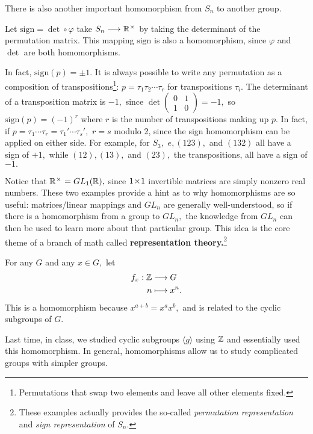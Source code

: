 There is also another important homomorphism from $S_n$ to another group.

\begin{example}
Let $\text{sign} = \det \circ \varphi$ take $S_n \longrightarrow \mathbb R^{\hspace{0.05em}{\times}\hspace{0.05em}}$ by taking the determinant of the permutation matrix. This mapping $\text{sign}$ is also a homomorphism, since $\varphi$ and $\det$ are both homomorphisms. 
\end{example}

In fact, $\text{sign}(p) = \pm 1$. It is always possible to write any permutation as a composition of transpositions\footnote{Permutations that swap two elements and leave all other elements fixed.}: $p = \tau_1\tau_2 \cdots \tau_r$ for transpositions $\tau_i$. The determinant of a transposition matrix is $-1,$ since $\det\begin{pmatrix} 0 & 1 \\ 1 & 0 \end{pmatrix} = -1,$ so $\text{sign}(p) = (-1)^r$ where $r$ is the number of transpositions making up $p.$ In fact, if $p = \tau_1\cdots \tau_r = \tau_1'\cdots\tau_s',$ $r = s$ modulo 2, since the sign homomorphism can be applied on either side. For example, for $S_3,$ $e, (123),$ and $(132)$ all have a sign of $+1,$ while $(12), (13),$ and $(23),$ the transpositions, all have a sign of $-1.$

Notice that $\mathbb R^{\hspace{0.05em}{\times}\hspace{0.05em}} = GL_1(\mathbb R),$ since $1 \hspace{0.05em}{\times}\hspace{0.05em} 1$ invertible matrices are simply nonzero real numbers. These two examples provide a hint as to why homomorphisms are so useful: matrices/linear mappings and $GL_n$ are generally well-understood, so if there is a homomorphism from a group to $GL_n,$ the knowledge from $GL_n$ can then be used to learn more about that particular group. This idea is the core theme of a branch of math called \textbf{representation theory.}\footnote{These examples actually provides the so-called \emph{permutation representation} and \emph{sign representation} of $S_n$.}

\begin{example}\label{fx example}
For any $G$ and any $x \in G,$ let 
\begin{align*}
    f_x: \mathbb Z &\longrightarrow G \\
    n &\longmapsto x^n.
\end{align*}
This is a homomorphism because $x^{a + b} = x^ax^b,$ and is related to the cyclic subgroups of $G.$
\end{example}
Last time, in class, we studied cyclic subgroups $\langle g \rangle$ using $\mathbb Z$ and essentially used this homomorphism. In general, homomorphisms allow us to study complicated groups with simpler groups.


